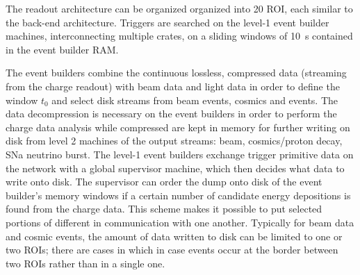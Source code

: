 
The \dual readout architecture can be organized organized into \num{20} ROI, each similar to the  back-end architecture. Triggers are searched on the level-1 event builder machines, interconnecting multiple  crates, on a sliding windows of \SI{10}{s}  contained in the event builder RAM. %


The event builders combine the continuous lossless, compressed data (streaming from the charge readout) with beam data and light data in order to define the window $t_0$ and select disk streams from beam events, cosmics and  events. The data decompression is necessary on the event builders in order to perform the charge data analysis while compressed are kept in memory for further writing on disk from level 2 machines of the output streams: beam, cosmics/proton decay, SNa neutrino burst. 
The level-1 event builders exchange trigger primitive data on the network with a global supervisor machine, which then decides what data to write onto disk.  The supervisor can order the dump onto disk of the event builder's memory  windows if a certain number of candidate energy depositions is found from the charge data. 
This scheme makes it possible to put selected portions of different  in communication with one another.  
Typically for beam data and cosmic events, the amount of data written to disk can be limited to one or two ROIs; there are cases in which in case events occur at the border between two ROIs rather than in a single one.